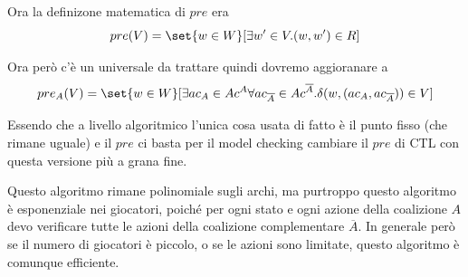Ora la definizone matematica di \(pre\) era
\[pre(V) = \set{w\in W}[\exists w' \in V. (w,w') \in R]\]

Ora però c'è un universale da trattare quindi dovremo aggioranare a 
\[pre_A(V) = \set{w\in W}[\exists {ac}_{A} \in Ac^A \forall {ac}_{\overline{A}} \in Ac^{\overline{A}}. \delta(w, ({ac}_A, {ac}_{\overline{A}})) \in V]\]

Essendo che a livello algoritmico l'unica cosa usata di fatto è il punto fisso (che rimane uguale) e il \(pre\) ci basta per il model checking cambiare il \(pre\) di CTL con questa versione più a grana fine.

Questo algoritmo rimane polinomiale sugli archi, ma purtroppo questo algoritmo è esponenziale nei giocatori, poiché per ogni stato e ogni azione della coalizione \(A\) devo verificare tutte le azioni della coalizione complementare \(\overline{A}\). In generale però se il numero di giocatori è piccolo, o se le azioni sono limitate, questo algoritmo è comunque efficiente.
